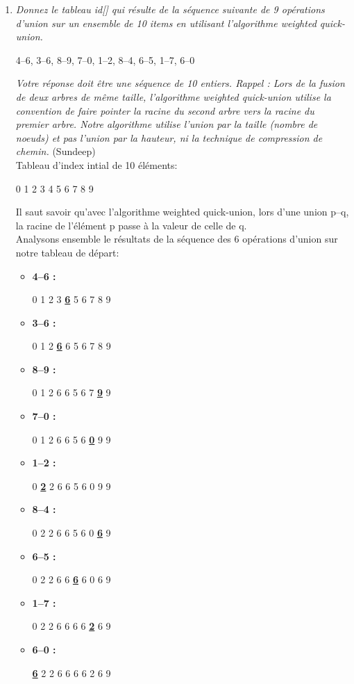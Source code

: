 \documentclass[11pt]{article}
\begin{document}
\begin{enumerate}
\item \textit{Donnez le tableau id[] qui résulte de la séquence suivante de 9 opérations d'union sur un ensemble de 10 items en utilisant l'algorithme weighted quick-union.}\\
\centerline{4--6, 3--6, 8--9, 7--0, 1--2, 8--4, 6--5, 1--7, 6--0}
\textit{Votre réponse doit être une séquence de 10 entiers. Rappel : Lors de la fusion de deux arbres de même taille, l'algorithme weighted quick-union utilise la convention de faire pointer la racine du second arbre vers la racine du premier arbre. Notre algorithme utilise l'union par la taille (nombre de noeuds) et pas l'union par la hauteur, ni la technique de compression de chemin.} (Sundeep) \bigskip \\
Tableau d'index intial de 10 éléments: \\
\centerline{0 1 2 3 4 5 6 7 8 9}
Il saut savoir qu'avec l'algorithme weighted quick-union, lors d'une union p--q, la racine de l'élément p passe à la valeur de celle de q.\\
Analysons ensemble le résultats de la séquence des 6 opérations d'union sur notre tableau de départ: \bigskip


\begin{itemize}
\item \textbf{4--6 :}\\
\centerline{0 1 2 3 \underline{\textbf{6}} 5 6 7 8 9}
\item \textbf{3--6 :}\\
\centerline{0 1 2 \underline{\textbf{6}} 6 5 6 7 8 9}
\item \textbf{8--9 :}\\
\centerline{0 1 2 6 6 5 6 7 \underline{\textbf{9}} 9}
\item \textbf{7--0 :}\\
\centerline{0 1 2 6 6 5 6 \underline{\textbf{0}} 9 9}
\item \textbf{1--2 :}\\
\centerline{0 \underline{\textbf{2}} 2 6 6 5 6 0 9 9}
\item \textbf{8--4 :}\\
\centerline{0 2 2 6 6 5 6 0 \underline{\textbf{6}} 9}
\item \textbf{6--5 :}\\
\centerline{0 2 2 6 6 \underline{\textbf{6}} 6 0 6 9}
\item \textbf{1--7 :}\\
\centerline{0 2 2 6 6 6 6 \underline{\textbf{2}} 6 9}
\item \textbf{6--0 :}\\
\centerline{\underline{\textbf{6}} 2 2 6 6 6 6 2 6 9}
\end{itemize}
\newpage




\end{enumerate}
\end{document}
